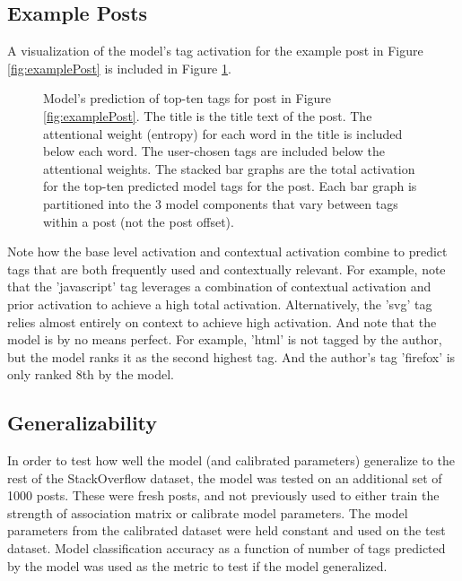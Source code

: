 \documentclass[10pt,letterpaper]{article}
\begin{document}
\subsection{Example Posts}

A visualization of the model's tag activation for the example post in Figure \ref{fig:examplePost} is included in Figure \ref{fig:modelPost}.

\begin{figure}[ht]
  \centering
  \caption{
    Model's prediction of top-ten tags for post in Figure \ref{fig:examplePost}.
    The title is the title text of the post.
    The attentional weight (entropy) for each word in the title is included below each word.
    The user-chosen tags are included below the attentional weights.
    The stacked bar graphs are the total activation for the top-ten predicted model tags for the post.
    Each bar graph is partitioned into the 3 model components that vary between tags within a post (not the post offset).
}
  \label{fig:modelPost}
\end{figure}

Note how the base level activation and contextual activation combine to predict tags that are both frequently used and contextually relevant.
For example, note that the 'javascript' tag leverages a combination of contextual activation and prior activation to achieve a high total activation.
Alternatively, the 'svg' tag relies almost entirely on context to achieve high activation.
And note that the model is by no means perfect.
For example, 'html' is not tagged by the author, but the model ranks it as the second highest tag.
And the author's tag 'firefox' is only ranked 8th by the model.

\subsection{Generalizability}

In order to test how well the model (and calibrated parameters) generalize to the rest of the StackOverflow dataset, the model was tested on an additional set of \num{1000} posts.
These were fresh posts, and not previously used to either train the strength of association matrix or calibrate model parameters.
The model parameters from the calibrated dataset were held constant and used on the test dataset.
Model classification accuracy as a function of number of tags predicted by the model was used as the metric to test if the model generalized.
\end{document}
